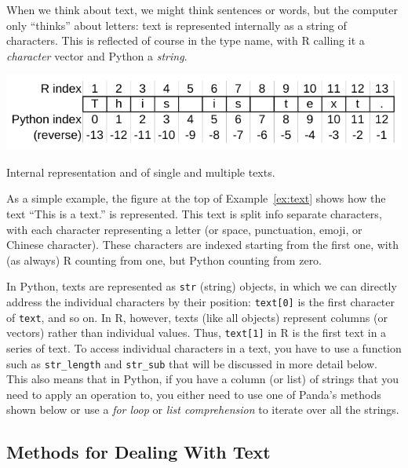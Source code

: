When we think about text, we might think sentences or words, but the computer only ``thinks'' about letters:
text is represented internally as a string of characters.
This is reflected of course in the type name, with R calling it a \emph{character} vector and Python a \emph{string}.

\begin{ccsexample}
  \begin{center} \includegraphics[width=.6\textwidth]{chapter09/text.pdf}\end{center}


  \caption{Internal representation and of single and multiple texts.}\label{ex:text}
\end{ccsexample}

As a simple example, the figure at the top of Example~\ref{ex:text} shows how the text ``This is a text.'' is represented.
This text is split info separate characters, with each character representing a letter (or space,  punctuation, emoji, or Chinese character).
These characters are indexed starting from the first one, with (as always) R counting from one, but Python counting from zero.

In Python, texts are represented as \texttt{str} (string) objects, in which we can directly address the individual characters by their position:
\verb|text[0]| is the first character of \verb|text|, and so on.
In R, however, texts (like all objects) represent columns (or vectors) rather than individual values.
Thus, \verb|text[1]| in R is the first text in a series of text.
To access individual characters in a text, you have to use a function such as \texttt{str\_length} and \texttt{str\_sub} that will be discussed in more detail below.
This also means that in Python, if you have a column (or list) of strings that you need to apply an operation to,
you either need to use one of Panda's methods shown below or use a \emph{for loop} or \emph{list comprehension} to iterate over all the strings.

\subsection{Methods for Dealing With Text}

